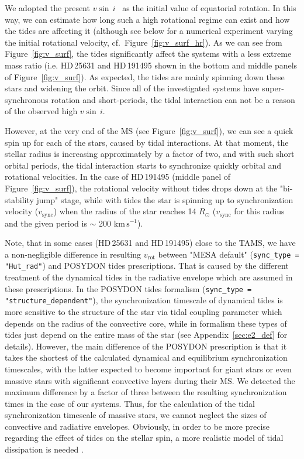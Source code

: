 \documentclass{aa}
\newcommand{\kms}{$\mathrm{km\,s^{-1}}$}
\newcommand{\vsini} {$v\sin\,i$}
\DeclareRobustCommand{\Figref}[1]{Figure~\ref{#1}}
\DeclareRobustCommand{\Appref}[1]{Appendix~\ref{#1}}
\begin{document}
We adopted the present \vsini~ as the initial value of equatorial
rotation. In this way, we can estimate how long such a high rotational
regime can exist and how the tides are affecting it (although see
below for a numerical experiment varying the initial rotational
velocity, cf.~\Figref{fig:v_surf_hr}). As we can see
from \Figref{fig:v_surf}, the tides significantly affect the systems
with a less extreme mass ratio (i.e. HD\,25631 and HD\,191495
shown in the bottom and middle panels of \Figref{fig:v_surf}).
As expected, the tides are mainly spinning down these stars and widening the orbit.
Since all of the investigated systems have super-synchronous rotation and short-periods, the tidal interaction can not be a reason of the
observed high \vsini.

However, at the very end of the MS
(see \Figref{fig:v_surf}), we can see a quick spin up for each of
the stars, caused by tidal interactions. At that moment, the stellar
radius is increasing approximately by a factor of two, and with
such short orbital periods, the tidal interaction starts to
synchronize quickly orbital and rotational velocities. In the case of
HD\,191495 (middle panel of \Figref{fig:v_surf}), the rotational
velocity without tides drops down at the "bi-stability jump" stage,
while with tides the star is spinning up to synchronization velocity
($v_\mathrm{sync}$) when the radius of the star reaches 14
$R_{\odot}$ ($v_\mathrm{sync}$ for this radius and the
given period is $\sim$ 200 \kms).

Note, that in some cases (HD\,25631 and HD\,191495) close to the TAMS, we have a non-negligible difference in resulting $v_\mathrm{rot}$ between "MESA default" (\texttt{sync\_type = "Hut\_rad"}) and POSYDON tides prescriptions.
That is caused by the different treatment of the dynamical tides in the radiative envelope which are assumed in these prescriptions.
In the POSYDON tides formalism (\texttt{sync\_type = "structure\_dependent"}), the synchronization timescale of dynamical tides is more sensitive to the structure of the star via tidal coupling parameter \citep[often called $E_{2}$, see Section 3 in][]{Qin_2018} which depends on the radius of the convective core, while in \citet{Hut_1980,Hurley_2002} formalism these types of tides just depend on the entire mass of the star (see \Appref{sec:e2_def} for details).
However, the main difference of the POSYDON prescription is that it takes the shortest of the calculated dynamical and equilibrium synchronization timescales, with the latter expected to become important for giant stars or even massive stars with significant convective layers during their MS.
We detected the maximum difference by a factor of three between the resulting synchronization times in the case of our systems.
Thus, for the calculation of the tidal synchronization timescale of massive stars, we cannot neglect the sizes of convective and radiative envelopes.
Obviously, in order to be more precise regarding the effect of tides on the stellar spin, a more realistic model of tidal dissipation is needed \citep[especially while investigating the spin distribution of black holes, see e.g.][]{Bavera_2020,Ma_2023}.
\end{document}
